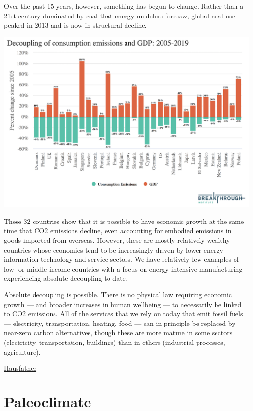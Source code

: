 \documentclass[
]{book}
\begin{document}
Over the past 15 years, however, something has begun to change. Rather than a 21st century dominated by coal that energy modelers foresaw, global coal use peaked in 2013 and is now in structural decline.

\includegraphics{fig/hausfather_decoupling.png}

These 32 countries show that it is possible to have economic growth at the same time that CO2 emissions decline, even accounting for embodied emissions in goods imported from overseas. However, these are mostly relatively wealthy countries whose economies tend to be increasingly driven by lower-energy information technology and service sectors. We have relatively few examples of low- or middle-income countries with a focus on energy-intensive manufacturing experiencing absolute decoupling to date.

Absolute decoupling is possible. There is no physical law requiring economic growth --- and broader increases in human wellbeing --- to necessarily be linked to CO2 emissions. All of the services that we rely on today that emit fossil fuels --- electricity, transportation, heating, food --- can in principle be replaced by near-zero carbon alternatives, though these are more mature in some sectors (electricity, transportation, buildings) than in others (industrial processes, agriculture).

\href{https://thebreakthrough.org/issues/energy/absolute-decoupling-of-economic-growth-and-emissions-in-32-countries}{Hausfather}

\hypertarget{paleoclimate}{%
\chapter{Paleoclimate}\label{paleoclimate}}
\end{document}
